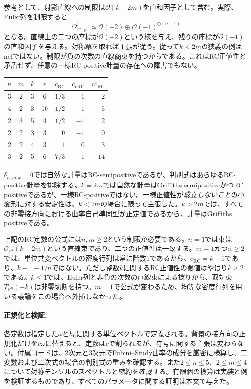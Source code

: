 \documentclass[12pt]{amsart}
\theoremstyle{definition}
\theoremstyle{remark}
\numberwithin{equation}{section}
\newcommand{\urc}{\mathrm{uRC}}
\newcommand{\rc}{\mathrm{RC}}
\newcommand{\Pp}{\mathbb P}
\newcommand{\cst}{\delta_{n,m,k}}
\begin{document}
参考として、射影直線への制限は$\mathcal O(k-2m)$を直和因子として含む。実際、Euler列を制限すると
\[
\Omega^1_{\Pp^n}|_{\Pp^1}
\simeq\mathcal O(-2)\oplus\mathcal O(-1)^{\oplus(n-1)}
\]
となる。直線上の二つの座標が$\mathcal O(-2)$という核を与え、残りの座標が$\mathcal O(-1)$の直和因子を与える。対称冪を取れば主張が従う。従って$k<2m$の狭義の例はnefではない。制限が負の次数の直線商束を持つからである。これはRC正値性と矛盾せず、任意の一様RC-positive計量の存在への障害でもない。

\begin{center}
\begin{tabular}{@{}ccccrrr@{}}
\toprule
$n$&$m$&$k$&$r$&$c_{\rc}$&$c_{\urc}$&$r c_{\rc}$\\
\midrule
3&2&3&6&$1/3$&$-1$&$2$\\
4&2&3&10&$1/2$&$-1$&$5$\\
2&3&5&4&$1/2$&$-1$&$2$\\
2&2&3&3&$0$&$-1$&$0$\\
2&2&4&3&$1$&$0$&$3$\\
3&2&5&6&$7/3$&$1$&$14$\\
\bottomrule
\end{tabular}
\end{center}

$\cst=0$では自然な計量はRC-semipositiveであるが、判別式はあらゆるRC-positive計量を排除する。$k=2m$では自然な計量はGriffiths semipositiveかつRC-positiveであるが、一様RC-positiveではない。一様正値性が\emph{成立しないこと}の小変形に対する安定性は、$k<2m$の場合に限って主張した。$k>2m$では、すべての非零接方向における曲率自己準同型が正定値であるから、計量はGriffiths positiveである。

上記のRC定数の公式には$n,m\ge2$という制限が必要である。$n=1$では束は$\mathcal O_{\Pp^1}(k-2m)$という直線束であり、二つの正値性は一致する。$m=1$かつ$n\ge2$では、単位共変ベクトルの密度行列は常に階数1であるから、$c_{\rc}=k-1$であり、$k-1-1/n$ではない。ただし整数$k$に関するRC正値性の閾値はやはり$k\ge2$である。$k\le1$では、Euler列と非負の次数の直線束による捻りから、双対束$T_{\Pp^n}(-k)$は非零切断を持つ。$m=1$で公式が変わるため、均等な密度行列を用いる議論をこの場合へ外挿しなかった。

\paragraph{正規化と検証.}
各定数は指定した$\omega$と$h_0$に関する単位ベクトルで定義される。背景の接方向の正規化だけを$c\omega$に替えると、定数は$c$で割られるが、符号に関する主張は変わらない。付属コードは、2次元と3次元でFubini--Study曲率の成分を厳密に検算し、二変数および二次式の場合の判別式の重みを確認する。また$2\le n\le5$、$2\le m\le4$について対称テンソルのスペクトルと縮約を確認する。有限個の検算は実装と例を検証するものであり、すべてのパラメータに関する証明は本文で与えた。
\end{document}
